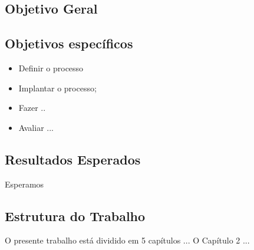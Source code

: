 \subsection{Objetivo Geral}	

\subsection{Objetivos específicos}
\begin{itemize}
 \item Definir o processo
  \item Implantar o processo;
  \item Fazer ..
  \item Avaliar ...
\end{itemize}
	
\subsection{Resultados Esperados}
Esperamos 
\subsection{Estrutura do Trabalho} 

O presente trabalho está dividido em 5 capítulos ...
O Capítulo 2 ...